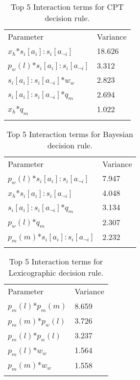 \begin{table}[H]
\caption{Top 5 Interaction terms for \ac{CPT} decision rule. \label{tab:sa_interaction_prospect_group_iqr_iqr}}
\begin{tabular} {ll}
\hline\noalign{\smallskip}
Parameter & Variance \\ 
\noalign{\smallskip}\svhline\noalign{\smallskip}

\(x_{h}\)*\(s_{i}[a_{i}]:s_{i}[a_{\neg i}]\) & 18.626\\
\(p_{w}(l)\)*\(s_{i}[a_{i}]:s_{i}[a_{\neg i}]\) & 3.312\\
\(s_{i}[a_{i}]:s_{i}[a_{\neg i}]\)*\(w_{w}\) & 2.823\\
\(s_{i}[a_{i}]:s_{i}[a_{\neg i}]\)*\(q_{m}\) & 2.694\\
\(x_{h}\)*\(q_{m}\) & 1.022\\
\noalign{\smallskip}\hline\noalign{\smallskip}
\end{tabular}
\end{table}

\begin{table}[H]
\caption{Top 5 Interaction terms for Bayesian decision rule. \label{tab:sa_interaction_sharing_group_iqr_iqr}}
\begin{tabular} {ll}
\hline\noalign{\smallskip}
Parameter & Variance \\
\noalign{\smallskip}\svhline\noalign{\smallskip}
\(p_{w}(l)\)*\(s_{i}[a_{i}]:s_{i}[a_{\neg i}]\) & 7.947\\
\(x_{h}\)*\(s_{i}[a_{i}]:s_{i}[a_{\neg i}]\) & 4.048\\
\(s_{i}[a_{i}]:s_{i}[a_{\neg i}]\)*\(q_{m}\) & 3.134\\
\(p_{w}(l)\)*\(q_{m}\) & 2.307\\
\(p_{m}(m)\)*\(s_{i}[a_{i}]:s_{i}[a_{\neg i}]\) & 2.232\\
\noalign{\smallskip}\hline\noalign{\smallskip}
\end{tabular}
\end{table}

\begin{table}[H]
\caption{Top 5 Interaction terms for Lexicographic decision rule. \label{tab:sa_interaction_lexic_group_iqr_iqr}}
\begin{tabular} {ll}
\hline\noalign{\smallskip}
Parameter & Variance \\
\noalign{\smallskip}\svhline\noalign{\smallskip}
\(p_{m}(l)\)*\(p_{m}(m)\) & 8.659\\
\(p_{m}(m)\)*\(p_{w}(l)\) & 3.726\\
\(p_{m}(l)\)*\(p_{w}(l)\) & 3.237\\
\(p_{m}(l)\)*\(w_{w}\) & 1.564\\
\(p_{m}(m)\)*\(w_{w}\) & 1.558\\
\noalign{\smallskip}\hline\noalign{\smallskip}
\end{tabular}
\end{table}

